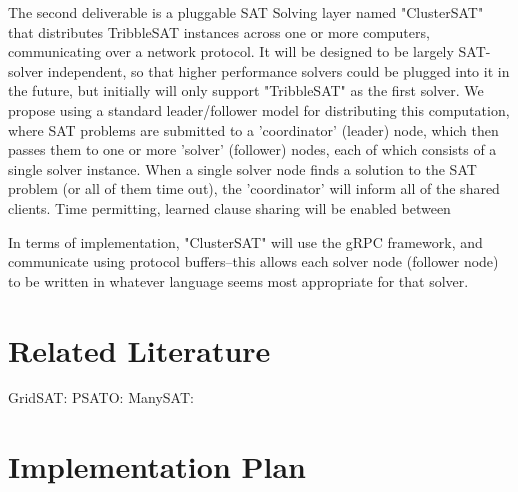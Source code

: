\documentclass[10pt]{article}
\begin{document}
  The second deliverable is a pluggable SAT Solving layer named "ClusterSAT" that distributes
  TribbleSAT instances across one or more computers, communicating over a network protocol.  It will
  be designed to be largely SAT-solver independent, so that higher performance solvers could be 
  plugged into it in the future, but initially will only support "TribbleSAT" as the first solver.
  We propose using a standard leader/follower model for distributing this computation, 
  where SAT problems are submitted to a 'coordinator' (leader) node, which then passes them to one or more 
  'solver' (follower) nodes, each of which consists of a single solver instance.  When a single solver node finds
  a solution to the SAT problem (or all of them time out), the 'coordinator' will inform all of the shared clients.
  Time permitting, learned clause sharing will be enabled between 

   In terms of implementation, "ClusterSAT" will use the gRPC framework, and 
  communicate using protocol buffers--this allows each solver node (follower node) to be written in whatever
  language seems most appropriate for that solver.

\section{Related Literature}
  GridSAT:
  PSATO:
  ManySAT:

\section{Implementation Plan}
\end{document}
